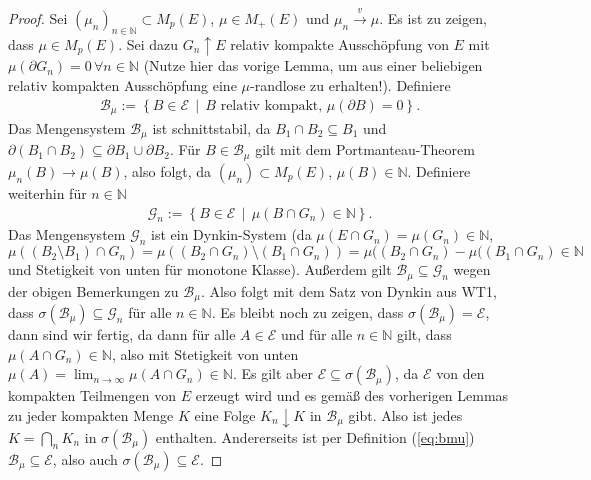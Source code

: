 \documentclass[twoside]{article}
\theoremstyle{definition}
\begin{document}
\begin{proof}
Sei $(\mu_n)_{n \in \mathbb{N}} \subset M_p(E)$, $\mu \in M_+(E)$ und $\mu_n \xrightarrow{v} \mu$. Es ist zu zeigen, dass $\mu \in M_p(E)$. Sei dazu $G_n \uparrow E$ relativ kompakte Ausschöpfung von $E$ mit $\mu(\partial G_n) = 0 \, \forall n \in \mathbb{N}$ (Nutze hier das vorige Lemma, um aus einer beliebigen relativ kompakten Ausschöpfung eine $\mu$-randlose zu erhalten!). Definiere
\begin{align}
\mathcal{B}_\mu := \left\{B \in \mathcal{E} \, \middle| \, B \text{ relativ kompakt, } \mu(\partial B) = 0 \right\}. \label{eq:bmu}
\end{align}
Das Mengensystem $\mathcal{B}_\mu$ ist schnittstabil, da $B_1 \cap B_2 \subseteq B_1$ und $\partial(B_1 \cap B_2) \subseteq \partial B_1 \cup \partial B_2$. Für $B \in \mathcal{B}_\mu$ gilt mit dem Portmanteau-Theorem $\mu_n(B) \to \mu(B)$, also folgt, da $(\mu_n) \subset M_p(E)$, $\mu(B) \in \mathbb{N}$.  Definiere weiterhin für $n \in \mathbb{N}$
\begin{align}
\mathcal{G}_n := \left\{B \in \mathcal{E} \, \middle| \, \mu(B \cap G_n) \in \mathbb{N} \right\}.
\end{align}
Das Mengensystem $\mathcal{G}_n$ ist ein Dynkin-System (da $\mu( E \cap G_n) = \mu(G_n) \in \mathbb{N}$, $\mu((B_2 \setminus B_1) \cap G_n) = \mu ((B_2 \cap G_n) \setminus (B_1 \cap G_n)) = \mu ((B_2 \cap G_n) - \mu ((B_1 \cap G_n) \in \mathbb{N}$ und Stetigkeit von unten für monotone Klasse). Außerdem gilt $\mathcal{B}_\mu \subseteq \mathcal{G}_n$ wegen der obigen Bemerkungen zu $\mathcal{B}_\mu$. Also folgt mit dem Satz von Dynkin aus WT1, dass $\sigma\left(\mathcal{B}_\mu \right) \subseteq \mathcal{G}_n$ für alle $n \in \mathbb{N}$. Es bleibt noch zu zeigen, dass $\sigma\left(\mathcal{B}_\mu \right) = \mathcal{E}$, dann sind wir fertig, da dann für alle $A \in \mathcal{E}$ und für alle $n \in \mathbb{N}$ gilt, dass $\mu(A \cap G_n) \in \mathbb{N}$, also mit Stetigkeit von unten $\mu(A) = \lim_{n \to \infty} \mu(A \cap G_n) \in \mathbb{N}$. Es gilt aber $\mathcal{E} \subseteq \sigma\left(\mathcal{B}_\mu \right)$, da $\mathcal{E}$ von den kompakten Teilmengen von $E$ erzeugt wird und es gemäß des vorherigen Lemmas zu jeder kompakten Menge $K$ eine Folge $K_n \downarrow K$ in $\mathcal{B}_\mu$ gibt. Also ist jedes $K = \bigcap_n K_n$ in $\sigma\left(\mathcal{B}_\mu \right)$ enthalten. Andererseits ist per Definition (\ref{eq:bmu}) $\mathcal{B}_\mu \subseteq \mathcal{E}$, also auch $\sigma\left(\mathcal{B}_\mu \right) \subseteq \mathcal{E}$.
\end{proof}
\end{document}
